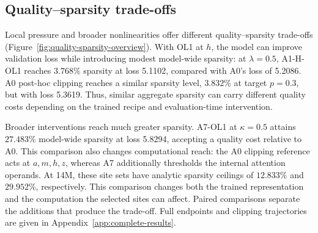 \subsection{Quality--sparsity trade-offs}
\label{sec:quality-sparsity-results}

Local pressure and broader nonlinearities offer different quality--sparsity trade-offs
(Figure~\ref{fig:quality-sparsity-overview}). With OL1 at $h$, the model can
improve validation loss while introducing modest model-wide sparsity:
at $\lambda=0.5$, A1-H-OL1 reaches $3.768\%$ sparsity at loss 5.1102,
compared with A0's loss of 5.2086. A0 post-hoc clipping reaches a similar
sparsity level, $3.832\%$ at target $p=0.3$, but with loss 5.3619. Thus,
similar aggregate sparsity can carry different quality costs depending on
the trained recipe and evaluation-time intervention.

Broader interventions reach much greater sparsity. A7-OL1 at $\kappa=0.5$
attains $27.483\%$ model-wide sparsity at loss 5.8294, accepting a quality
cost relative to A0. This comparison also changes computational reach:
the A0 clipping reference acts at $a,m,h,z$, whereas A7 additionally thresholds
the internal attention operands. At 14M, these site sets have analytic sparsity
ceilings of $12.833\%$ and $29.952\%$, respectively. This comparison changes
both the trained representation and the computation the selected sites can
affect. Paired comparisons separate the additions that produce the trade-off. Full endpoints
and clipping trajectories are given in Appendix~\ref{app:complete-results}.

